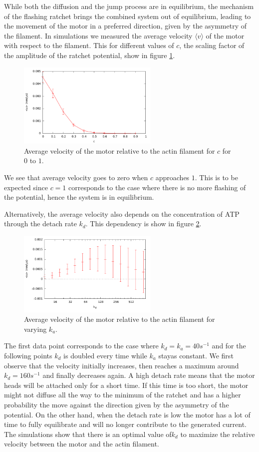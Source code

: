 \documentclass[aps,pre,onecolumn,showpacs,showkeys,a4paper]{revtex4}
\begin{document}
While both the diffusion and the jump process are in equilibrium, the mechanism of the flashing ratchet brings the combined system out of equilibrium, leading to the movement of the motor in a preferred direction, given by the asymmetry of the filament. In simulations we measured the average velocity $\langle v\rangle$ of the motor with respect to the filament. This for different values of $c$, the scaling factor of the amplitude of the ratchet potential, show in figure \ref{Fig: c_v}.
\begin{figure}[h]
\centering
\includegraphics[width=0.6\textwidth,height=!]{c_v_4heads}
\caption{Average velocity of the motor relative to the actin filament for $c$ for $0$ to $1$.} 
\label{Fig: c_v}
\end{figure}
We see that average velocity goes to zero when $c$ approaches $1$. This is to be expected since $c=1$ corresponds to the case where there is no more flashing of the potential, hence the system is in equilibrium.\par
Alternatively, the average velocity also depends on the concentration of ATP through the detach rate $k_{d}$. This dependency is show in figure \ref{Fig: v_k}.
\begin{figure}[h]
\centering
\includegraphics[width=0.6\textwidth,height=!]{v_k}
\caption{Average velocity of the motor relative to the actin filament for varying $k_{a}$.}
\label{Fig: v_k} 
\end{figure}
The first data point corresponds to the case where $k_{d} = k_{a} = 40 s^{-1}$ and for the following points $k_{d}$ is doubled every time while $k_{a}$ stayas constant. We first observe that the velocity initially increases, then reaches a maximum around $k_{d} = 160 s^{-1}$ and finally decreases again. A high detach rate means that the motor heads will be attached only for a short time. If this time is too short, the motor might not diffuse all the way to the minimum of the ratchet and has a higher probability the move against the direction given by the asymmetry of the potential. On the other hand, when the detach rate is low the motor has a lot of time to fully equilibrate and will no longer contribute to the generated current. The simulations show that there is an optimal value of$k_{d}$ to maximize the relative velocity between the motor and the actin filament. 
\end{document}
